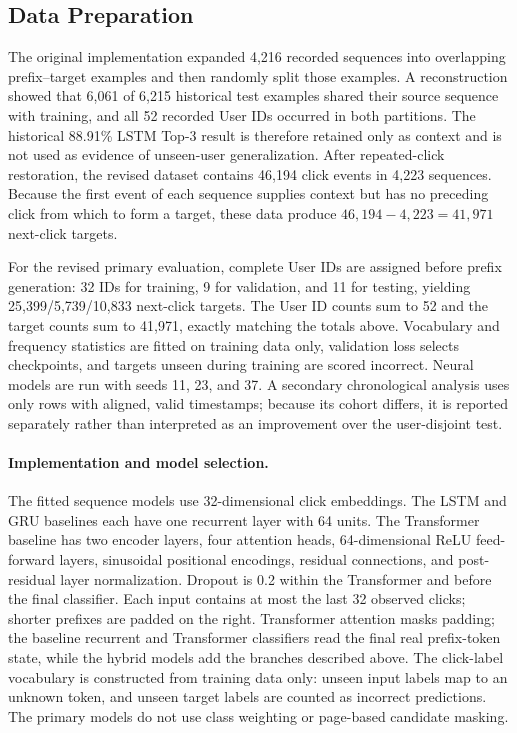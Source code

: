 \documentclass[sn-mathphys-num, Numbered]{sn-jnl}%
\theoremstyle{thmstyleone}%
\theoremstyle{thmstyletwo}%
\theoremstyle{thmstylethree}%
\begin{document}
\subsection{Data Preparation}
The original implementation expanded 4,216 recorded sequences into overlapping prefix--target examples and then randomly split those examples. A reconstruction showed that 6,061 of 6,215 historical test examples shared their source sequence with training, and all 52 recorded User IDs occurred in both partitions. The historical 88.91\% LSTM Top-3 result is therefore retained only as context and is not used as evidence of unseen-user generalization. After repeated-click restoration, the revised dataset contains 46,194 click events in 4,223 sequences. Because the first event of each sequence supplies context but has no preceding click from which to form a target, these data produce $46{,}194-4{,}223=41{,}971$ next-click targets.

For the revised primary evaluation, complete User IDs are assigned before prefix generation: 32 IDs for training, 9 for validation, and 11 for testing, yielding 25,399/5,739/10,833 next-click targets. The User ID counts sum to 52 and the target counts sum to 41,971, exactly matching the totals above. Vocabulary and frequency statistics are fitted on training data only, validation loss selects checkpoints, and targets unseen during training are scored incorrect. Neural models are run with seeds 11, 23, and 37. A secondary chronological analysis uses only rows with aligned, valid timestamps; because its cohort differs, it is reported separately rather than interpreted as an improvement over the user-disjoint test.

\paragraph{Implementation and model selection.} The fitted sequence models use 32-dimensional click embeddings. The LSTM and GRU baselines each have one recurrent layer with 64 units. The Transformer baseline has two encoder layers, four attention heads, 64-dimensional ReLU feed-forward layers, sinusoidal positional encodings, residual connections, and post-residual layer normalization. Dropout is 0.2 within the Transformer and before the final classifier. Each input contains at most the last 32 observed clicks; shorter prefixes are padded on the right. Transformer attention masks padding; the baseline recurrent and Transformer classifiers read the final real prefix-token state, while the hybrid models add the branches described above. The click-label vocabulary is constructed from training data only: unseen input labels map to an unknown token, and unseen target labels are counted as incorrect predictions. The primary models do not use class weighting or page-based candidate masking.
\end{document}
